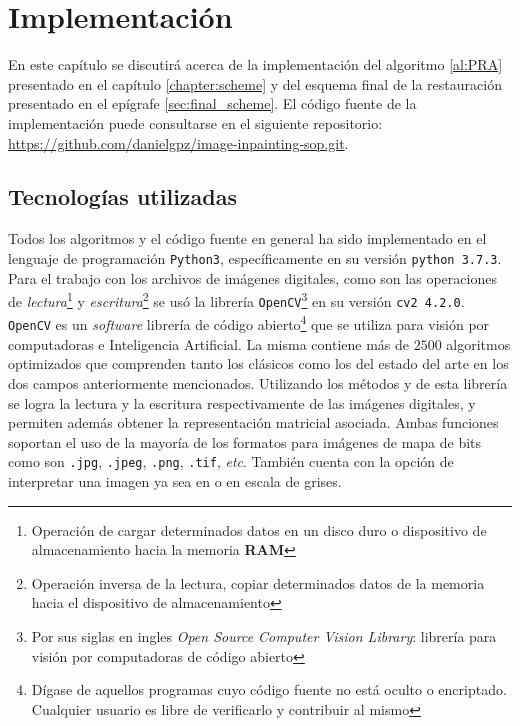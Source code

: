 \chapter{Implementaci\'on}\label{chapter:code}

En este capítulo se discutirá acerca de la implementación del algoritmo \ref{al:PRA} presentado en el capítulo \ref{chapter:scheme} y del esquema final de la restauraci\'on presentado en el epígrafe \ref{sec:final_scheme}. El c\'odigo fuente de la implementaci\'on puede consultarse en el siguiente repositorio: \url{https://github.com/danielgpz/image-inpainting-sop.git}.

\section{Tecnolog\'ias utilizadas}
Todos los algoritmos y el c\'odigo fuente en general ha sido implementado en el lenguaje de programaci\'on \texttt{Python3}, específicamente en su versi\'on \texttt{python 3.7.3}. Para el trabajo con los archivos de im\'agenes digitales, como son las operaciones de \textit{lectura}\footnote{Operaci\'on de cargar determinados datos en un disco duro o dispositivo de almacenamiento hacia la memoria \textbf{RAM}} y \textit{escritura}\footnote{Operaci\'on inversa de la lectura, copiar determinados datos de la memoria hacia el dispositivo de almacenamiento} se us\'o la librer\'ia \texttt{OpenCV}\footnote{Por sus siglas en ingles \textit{Open Source Computer Vision Library}: librer\'ia para visi\'on por computadoras de c\'odigo abierto} en su versi\'on \texttt{cv2 4.2.0}. \texttt{OpenCV} es un \textit{software} librer\'ia de c\'odigo abierto\footnote{D\'igase de aquellos programas cuyo c\'odigo fuente no est\'a oculto o encriptado. Cualquier usuario es libre de verificarlo y contribuir al mismo} que se utiliza para visi\'on por computadoras e Inteligencia Artificial. La misma contiene m\'as de $2500$ algoritmos optimizados que comprenden tanto los cl\'asicos como los del estado del arte en los dos campos anteriormente mencionados. Utilizando los m\'etodos  y  de esta librer\'ia se logra la lectura y la escritura respectivamente de las im\'agenes digitales, y permiten adem\'as obtener la representaci\'on matricial asociada. Ambas funciones soportan el uso de la mayor\'ia de los formatos para imágenes de mapa de bits como son \texttt{.jpg}, \texttt{.jpeg}, \texttt{.png}, \texttt{.tif}, \textit{etc}. Tambi\'en cuenta con la opción de interpretar una imagen ya sea en \RGB o en escala de grises.

